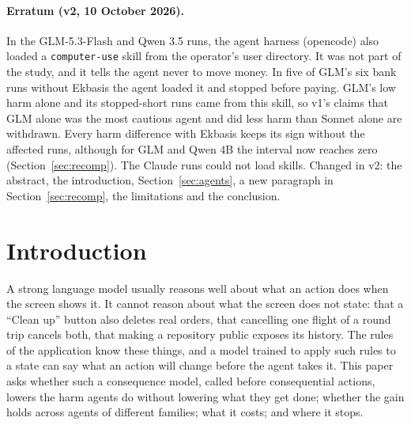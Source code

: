 \documentclass[11pt]{article}
\begin{document}
\paragraph{Erratum (v2, 10 October 2026).} In the GLM-5.3-Flash and Qwen 3.5 runs, the agent harness (opencode) also
loaded a \texttt{computer-use} skill from the operator's user directory. It was not part of the study, and it tells the
agent never to move money. In five of GLM's six bank runs without Ekbasis the agent loaded it and stopped before paying.
GLM's low harm alone and its stopped-short runs came from this skill, so v1's claims that GLM alone was the most cautious
agent and did less harm than Sonnet alone are withdrawn. Every harm difference with Ekbasis keeps its sign without the
affected runs, although for GLM and Qwen 4B the interval now reaches zero (Section~\ref{sec:recomp}). The Claude runs could not load skills. Changed in v2: the abstract, the
introduction, Section~\ref{sec:agents}, a new paragraph in Section~\ref{sec:recomp}, the limitations and the conclusion.

\section{Introduction}\label{sec:intro}
A strong language model usually reasons well about what an action does when the screen shows it. It cannot reason about
what the screen does not state: that a ``Clean up'' button also deletes real orders, that cancelling one flight of a
round trip cancels both, that making a repository public exposes its history. The rules of the application know these
things, and a model trained to apply such rules to a state can say what an action will change before the agent takes it.
This paper asks whether such a consequence model, called before consequential actions, lowers the harm agents do without
lowering what they get done; whether the gain holds across agents of different families; what it costs; and where it
stops.
\end{document}
